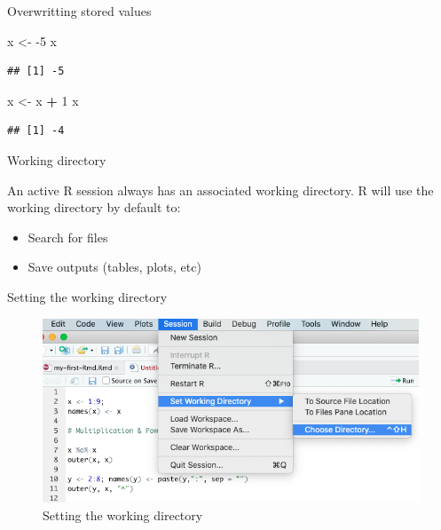 \documentclass[ignorenonframetext,]{beamer}
\newenvironment{Shaded}{\begin{snugshade}}{\end{snugshade}}
\newcommand{\DecValTok}[1]{\textcolor[rgb]{0.00,0.00,0.81}{#1}}
\newcommand{\NormalTok}[1]{#1}
\newcommand{\OperatorTok}[1]{\textcolor[rgb]{0.81,0.36,0.00}{\textbf{#1}}}
\newcommand{\StringTok}[1]{\textcolor[rgb]{0.31,0.60,0.02}{#1}}
\providecommand{\tightlist}{%
  \setlength{\itemsep}{0pt}\setlength{\parskip}{0pt}}
\begin{document}
\begin{frame}[fragile]{Overwritting stored values}
\protect\hypertarget{overwritting-stored-values}{}

\begin{Shaded}
\begin{Highlighting}[]
\NormalTok{x <-}\StringTok{ }\DecValTok{-5}
\NormalTok{x}
\end{Highlighting}
\end{Shaded}

\begin{verbatim}
## [1] -5
\end{verbatim}

\begin{Shaded}
\begin{Highlighting}[]
\NormalTok{x <-}\StringTok{ }\NormalTok{x }\OperatorTok{+}\StringTok{ }\DecValTok{1} 
\NormalTok{x}
\end{Highlighting}
\end{Shaded}

\begin{verbatim}
## [1] -4
\end{verbatim}

\end{frame}

\begin{frame}{Working directory}
\protect\hypertarget{working-directory}{}

An active R session always has an associated working directory. R will
use the working directory by default to:

\begin{itemize}
\tightlist
\item
  Search for files
\item
  Save outputs (tables, plots, etc)
\end{itemize}

\end{frame}

\begin{frame}{Setting the working directory}
\protect\hypertarget{setting-the-working-directory}{}

\begin{figure}
\includegraphics[scale = .38]{figures/wd}
\caption{Setting the working directory}
\end{figure}

\end{frame}
\end{document}
